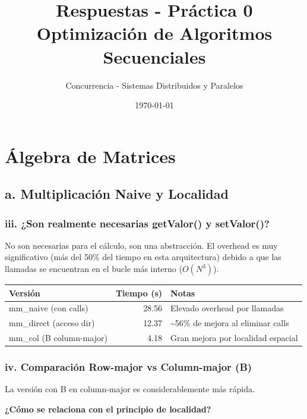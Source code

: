 \documentclass[11pt,a4paper]{article}
\title{Respuestas - Práctica 0\\Optimización de Algoritmos Secuenciales}
\author{Concurrencia - Sistemas Distribuidos y Paralelos}
\date{\today}
\begin{document}
\maketitle

\tableofcontents

\newpage

\section{Álgebra de Matrices}

\subsection*{a. Multiplicación Naive y Localidad}

\subsubsection*{iii. ¿Son realmente necesarias getValor() y setValor()?}

No son necesarias para el cálculo, son una abstracción. El overhead es muy significativo (más del 50\% del tiempo en esta arquitectura) debido a que las llamadas se encuentran en el bucle más interno ($O(N^3)$).

\begin{center}
\begin{tabular}{|l|r|l|}
\hline
\textbf{Versión} & \textbf{Tiempo (s)} & \textbf{Notas} \\
\hline
mm\_naive (con calls) & 28.56 & Elevado overhead por llamadas \\
mm\_direct (acceso dir) & 12.37 & \textasciitilde56\% de mejora al eliminar calls \\
mm\_col (B column-major) & 4.18 & Gran mejora por localidad espacial \\
\hline
\end{tabular}
\end{center}

\subsubsection*{iv. Comparación Row-major vs Column-major (B)}

La versión con B en column-major es considerablemente más rápida.

\textbf{¿Cómo se relaciona con el principio de localidad?}
\end{document}
